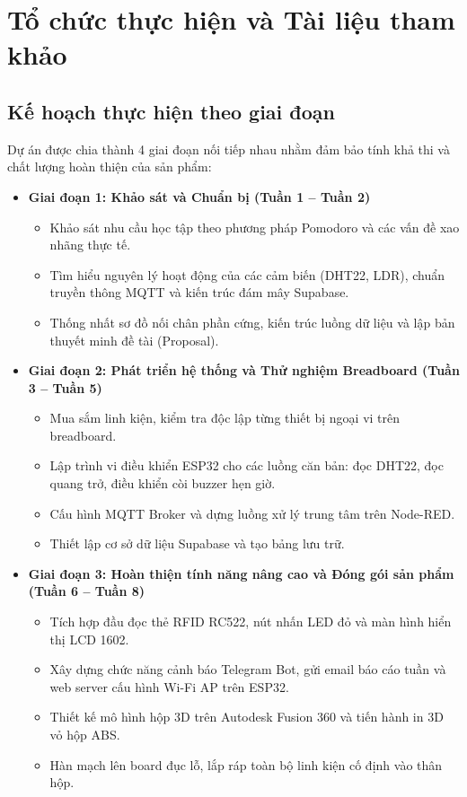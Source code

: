 \section{Tổ chức thực hiện và Tài liệu tham khảo}

\subsection{Kế hoạch thực hiện theo giai đoạn}

Dự án được chia thành 4 giai đoạn nối tiếp nhau nhằm đảm bảo tính khả thi và chất lượng hoàn thiện của sản phẩm:

\begin{itemize}[leftmargin=0.8cm]
    \item \textbf{Giai đoạn 1: Khảo sát và Chuẩn bị (Tuần 1 – Tuần 2)}
    \begin{itemize}
        \item Khảo sát nhu cầu học tập theo phương pháp Pomodoro và các vấn đề xao nhãng thực tế.
        \item Tìm hiểu nguyên lý hoạt động của các cảm biến (DHT22, LDR), chuẩn truyền thông MQTT và kiến trúc đám mây Supabase.
        \item Thống nhất sơ đồ nối chân phần cứng, kiến trúc luồng dữ liệu và lập bản thuyết minh đề tài (Proposal).
    \end{itemize}

    \item \textbf{Giai đoạn 2: Phát triển hệ thống và Thử nghiệm Breadboard (Tuần 3 – Tuần 5)}
    \begin{itemize}
        \item Mua sắm linh kiện, kiểm tra độc lập từng thiết bị ngoại vi trên breadboard.
        \item Lập trình vi điều khiển ESP32 cho các luồng căn bản: đọc DHT22, đọc quang trở, điều khiển còi buzzer hẹn giờ.
        \item Cấu hình MQTT Broker và dựng luồng xử lý trung tâm trên Node-RED.
        \item Thiết lập cơ sở dữ liệu Supabase và tạo bảng lưu trữ.
    \end{itemize}

    \item \textbf{Giai đoạn 3: Hoàn thiện tính năng nâng cao và Đóng gói sản phẩm (Tuần 6 – Tuần 8)}
    \begin{itemize}
        \item Tích hợp đầu đọc thẻ RFID RC522, nút nhấn LED đỏ và màn hình hiển thị LCD 1602.
        \item Xây dựng chức năng cảnh báo Telegram Bot, gửi email báo cáo tuần và web server cấu hình Wi-Fi AP trên ESP32.
        \item Thiết kế mô hình hộp 3D trên Autodesk Fusion 360 và tiến hành in 3D vỏ hộp ABS.
        \item Hàn mạch lên board đục lỗ, lắp ráp toàn bộ linh kiện cố định vào thân hộp.
    \end{itemize}


\end{itemize}
